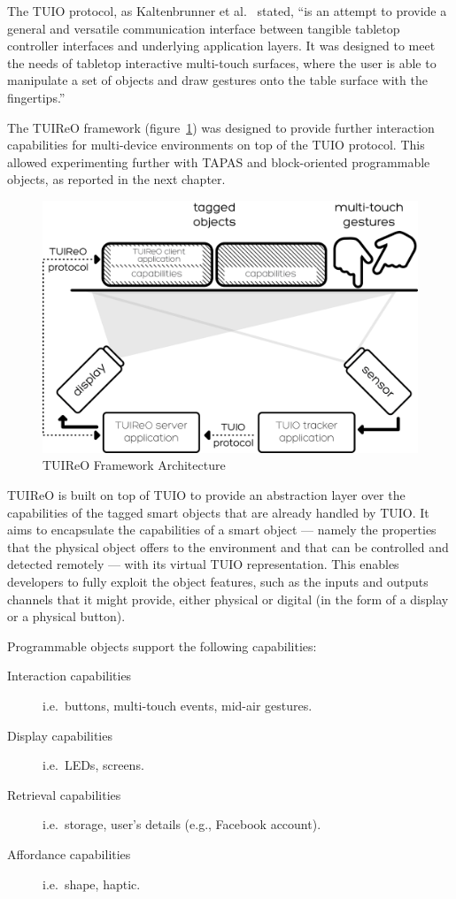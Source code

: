 The \ac{TUIO} protocol, as Kaltenbrunner et al.~\cite{kaltenbrunner2005tuio} stated, ``is an attempt to provide a general and versatile communication interface between tangible tabletop controller interfaces and underlying application layers. It was designed to meet the needs of tabletop interactive multi-touch surfaces, where the user is able to manipulate a set of objects and draw gestures onto the table surface with the fingertips.''

The \ac{TUIReO} framework (figure~\ref{fig:tuireo}) was designed to provide further interaction capabilities for multi-device environments on top of the \ac{TUIO} protocol. This allowed experimenting further with \ac{TAPAS} and block-oriented programmable objects, as reported in the next chapter.

\begin{figure}[ht!]
\centering
\includegraphics[width=\textwidth]{images/c4/TUIReO.png}
\caption{\ac{TUIReO} Framework Architecture}\label{fig:tuireo}
\end{figure}

\ac{TUIReO} is built on top of \ac{TUIO} to provide an abstraction layer over the capabilities of the tagged smart objects that are already handled by \ac{TUIO}. It aims to encapsulate the capabilities of a smart object --- namely the properties that the physical object offers to the environment and that can be controlled and detected remotely --- with its virtual \ac{TUIO} representation. This enables developers to fully exploit the object features, such as the inputs and outputs channels that it might provide, either physical or digital (in the form of a display or a physical button). 

Programmable objects support the following capabilities:
\begin{description}
\item[Interaction capabilities] i.e.\ buttons, multi-touch events, mid-air gestures.
\item[Display capabilities] i.e.\ LEDs, screens.
\item[Retrieval capabilities] i.e.\ storage, user's details (e.g., Facebook account).
\item[Affordance capabilities] i.e.\ shape, haptic.
\end{description}

